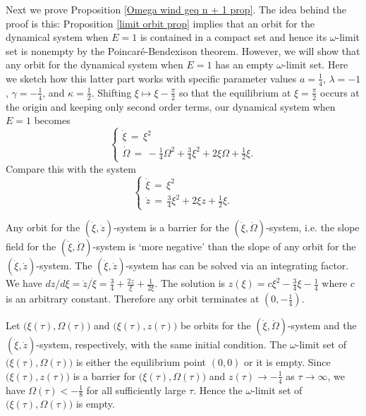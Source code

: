 \documentclass[11 pt]{article}
\renewcommand\l{\lambda}
\renewcommand\({\left(}
\renewcommand\){\right)}
\newcommand\<{\langle}
\renewcommand\>{\rangle}
\renewcommand\l{\lambda}
\newcommand\g{\gamma}
\newcommand\8{\infty}
\begin{document}
\medskip
\medskip

Next we prove Proposition \ref{Omega wind geq n + 1 prop}. The idea behind the proof is this: Proposition \ref{limit orbit prop} implies that an orbit for the dynamical system when $E = 1$ is contained in a compact set and hence its $\omega$-limit set is nonempty by the Poincar{\'e}-Bendexison theorem. However, we will show that any orbit for the dynamical system when $E = 1$ has an empty $\omega$-limit set. Here we sketch how this latter part works with specific parameter values $a = \frac{1}{4}$, $\l = -1$, $\g = -\frac{1}{4}$, and $\kappa = \frac{1}{2}$.  Shifting $\xi \mapsto \xi - \frac{\pi}{2}$ so that the equilibrium at $\xi = \frac{\pi}{2}$ occurs at the origin and keeping only second order terms, our dynamical system when $E = 1$ becomes 
\[
\left\{
 \begin{array}{ll}
      \dot{\xi} \,=\, \xi^2   \\
      \dot{\Omega} \,=\,  - \frac{1}{4}\Omega^2 + \frac{3}{4}\xi^2  + 2\xi \Omega + \frac{1}{2} \xi .
\end{array} 
\right.
\]
Compare this with the system
\[
\left\{
 \begin{array}{ll}
      \dot{\xi} \,=\, \xi^2   \\
      \dot{z} \,=\,    \frac{3}{4}\xi^2  + 2\xi z + \frac{1}{2} \xi .
\end{array} 
\right. 
\]

Any orbit for the $(\dot{\xi}, \dot{z})$-system is a barrier for the $(\dot{\xi}, \dot{\Omega})$-system, i.e. the slope field for the $(\dot{\xi}, \dot{\Omega})$-system is `more negative' than the slope of any orbit for the $(\dot{\xi}, \dot{z})$-system.  The $(\dot{\xi}, \dot{z})$-system has can be solved via an integrating factor. We have $dz/d\xi = \dot{z}/\dot{\xi} = \frac{3}{4} +  \frac{2z}{\xi} + \frac{1}{2\xi}$. The solution is $z(\xi) = c\xi^2 - \frac{3}{4}\xi - \frac{1}{4}$ where $c$ is an arbitrary constant. Therefore any orbit terminates at $(0,-\frac{1}{4})$. 

Let $\big(\xi(\tau), \Omega(\tau)\big)$ and $\big(\xi(\tau), z(\tau)\big)$ be orbits for the $(\dot{\xi}, \dot{\Omega})$-system and the $(\dot{\xi}, \dot{z})$-system, respectively,  with the same initial condition. The $\omega$-limit set of $\big(\xi(\tau), \Omega(\tau)\big)$ is either the equilibrium point $(0,0)$ or it is empty. Since $\big(\xi(\tau), z(\tau)\big)$ is a barrier for $\big(\xi(\tau), \Omega(\tau)\big)$ and $z(\tau) \to -\frac{1}{4}$ as $\tau \to \infty$, we have $\Omega(\tau) < -\frac{1}{8}$ for all sufficiently large $\tau$.  Hence the $\omega$-limit set of $\big(\xi(\tau), \Omega(\tau)\big)$ is empty.  
\end{document}
